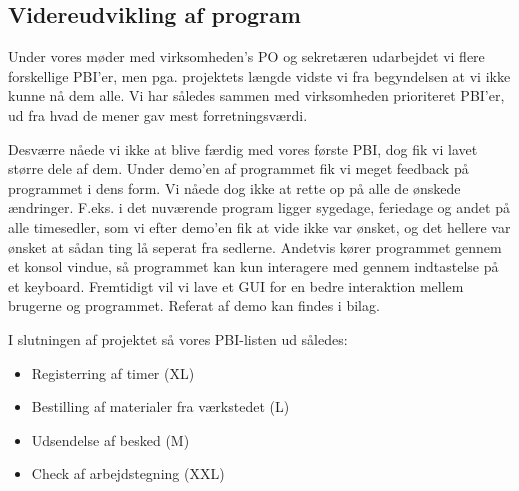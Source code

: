 \subsection{Videreudvikling af program}

Under vores møder med virksomheden's PO og sekretæren udarbejdet vi flere forskellige PBI'er, men pga. projektets længde vidste vi fra begyndelsen at vi ikke kunne nå dem alle. Vi har således sammen med virksomheden prioriteret PBI'er, ud fra hvad de mener gav mest forretningsværdi.

Desværre nåede vi ikke at blive færdig med vores første PBI, dog fik vi lavet større dele af dem. Under demo'en af programmet fik vi meget feedback på programmet i dens form. Vi nåede dog ikke at rette op på alle de ønskede ændringer. F.eks. i det nuværende program ligger sygedage, feriedage og andet på alle timesedler, som vi efter demo'en fik at vide ikke var ønsket, og det hellere var ønsket at sådan ting lå seperat fra sedlerne. Andetvis kører programmet gennem et konsol vindue, så programmet kan kun interagere med gennem indtastelse på et keyboard. Fremtidigt vil vi lave et GUI for en bedre interaktion mellem brugerne og programmet. Referat af demo kan findes i bilag.

I slutningen af projektet så vores PBI-listen ud således:
\begin{itemize}
\item Registerring af timer (XL)
\item Bestilling af materialer fra værkstedet (L) 
\item Udsendelse af besked (M)
\item Check af arbejdstegning (XXL)
\end{itemize}  